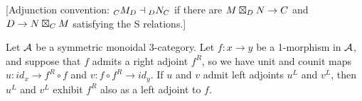 \documentclass{amsart}
\begin{document}
[Adjunction convention: ${}_{C} {M}_{D} \dashv  {}_{D} {N}_{C}$ if there are $M \boxtimes_D N \rightarrow C$ and $D \rightarrow N \boxtimes_C M$ satisfying the S relations.] 




\begin{proposition} \label{prop-ambiadjoints}
	Let $\mathcal A$ be a symmetric monoidal 3-category. Let $f: x \to y$ be a 1-morphism in $\mathcal A$, and suppose that $f$ admits a right adjoint $f^R$,  so we have unit and counit maps $u:id_x \to f^R \circ f$ and $v:f \circ f^R \to id_y$. If $u$ and $v$ admit left adjoints $u^L$ and $v^L$, then $u^L$ and $v^L$ exhibit $f^R$ also as a left adjoint to $f$. 
\end{proposition}
\end{document}
